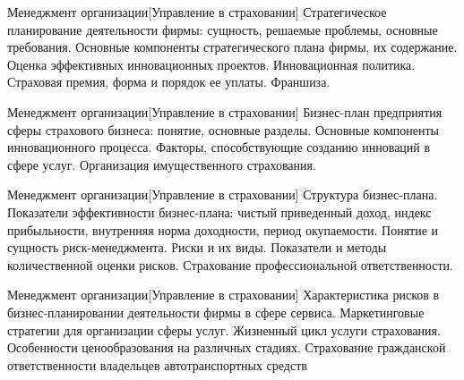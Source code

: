 \documentclass[
	11pt,
	a4paper,
	]
	{article}
\begin{document}
\begin{minipage}[t][\miniH]{\miniL}\centering
	 {Менеджмент организации}[Управление в страховании]
		{
			Стратегическое планирование деятельности фирмы: сущность, решаемые проблемы, основные требования. Основные компоненты стратегического плана фирмы, их содержание.
		}{
			Оценка эффективных инновационных проектов. Инновационная политика.
		}{
			Страховая премия, форма и порядок ее уплаты. Франшиза.
		}
	\lowGE
\end{minipage}

\vfill



\begin{minipage}[t][\miniH]{\miniL}\centering
	 {Менеджмент организации}[Управление в страховании]
		{
			Бизнес-план предприятия сферы страхового бизнеса: понятие, основные разделы.
		}{
			Основные компоненты инновационного процесса. Факторы, способствующие созданию инноваций в сфере услуг.
		}{
			Организация имущественного страхования.
		}
	\lowGE
\end{minipage}

\vfill



\begin{minipage}[t][\miniH]{\miniL}\centering
	 {Менеджмент организации}[Управление в страховании]
		{
			Структура бизнес-плана. Показатели эффективности бизнес-плана: чистый приведенный доход, индекс прибыльности, внутренняя норма доходности, период окупаемости.
		}{
			Понятие и сущность риск-менеджмента. Риски и их виды. Показатели и методы количественной оценки рисков.
		}{
			Страхование профессиональной ответственности.
		}
	\lowGE
\end{minipage}





\begin{minipage}[t][\miniH]{\miniL}\centering
	 {Менеджмент организации}[Управление в страховании]
		{
			Характеристика рисков в бизнес-планировании деятельности фирмы в сфере сервиса.
		}{
			Маркетинговые стратегии для организации сферы услуг. Жизненный цикл услуги страхования. Особенности ценообразования на различных стадиях.
		}{
			Страхование гражданской ответственности владельцев автотранспортных средств
		}
	\lowGE
\end{minipage}

\vfill
\end{document}
